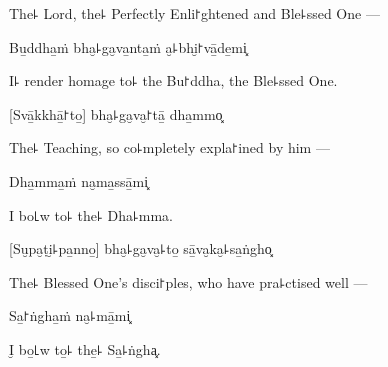 \begin{english}
  The꜕ Lord, the꜕ Perfectly Enli꜓ghtened and Ble꜕ssed One ---
\end{english}

Bu̱ddha̱ṁ bha̮꜕ga̮va̱nta̱ṁ a̮꜕bhi̮꜓vā̱de̱mi͓

\begin{english}
  I꜕ render homage to꜕ the Bu꜓ddha, the Ble꜕ssed One.
\end{english}

[Svā̱kkhā̱꜓to̱] bha̮꜕ga̮va̮꜓tā̱ dha̱mmo͓

\begin{english}
  The꜕ Teaching, so co꜕mpletely expla꜓ined by him ---
\end{english}

Dha̱mma̱ṁ na̮ma̱ssā̱mi͓

\begin{english}
  I bo꜖w to꜕ the꜕ Dha꜕mma.
\end{english}


[Su̮pa̮ṭi̮꜕pa̱nno̱] bha̮꜕ga̮va̮꜕to̱ sā̱va̮ka̮꜕sa̱ṅgho͓

\begin{english}
  The꜕ Blessed One's disci꜓ples, who have pra꜕ctised well ---
\end{english}

Sa̱꜓ṅgha̱ṁ na̮꜕mā̱mi͓

\begin{english}
  I̮ bo̱꜖w to̱꜕ the̱꜕ Sa̱꜕ṅgha͓.
\end{english}

